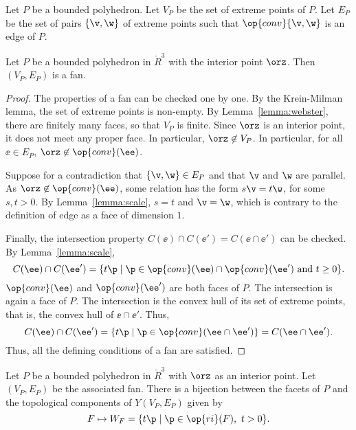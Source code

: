 \begin{definition}[$(V_P,E_P)$]
Let $P$ be a bounded polyhedron.  Let
$V_P$ be the set of extreme points of $P$.  Let $E_P$ be the set of pairs
$\{\v,\w\}$ of extreme points such that $\op{conv}\{\v,\w\}$ is an edge of
$P$.
\end{definition}
%
%

\begin{lemma}[]\label{lemma:polyhedron}%
Let $P$ be a bounded polyhedron in $\ring{R}^3$ with the interior
point $\orz$.  Then $(V_P,E_P)$ is a fan.
\end{lemma}
%

\begin{proof} The properties of a fan can be checked one by one.  By
the Krein-Milman lemma, the set of extreme points is non-empty.  By
Lemma~\ref{lemma:webster}, there are finitely many faces, so that
$V_P$ is finite.  Since $\orz$ is an interior point, it does not
meet any proper face.  In particular, $\orz\not\in V_P$.  In particular,
for all $\ee\in E_P$, $\orz\not\in \op{conv}(\ee)$.

Suppose for a contradiction that $\{\v,\w\}\in E_P$ and that $\v$
and $\w$ are parallel.  As $\orz\not\in \op{conv}(\ee)$, some
relation has the form $s \v = t \w$, for some $s, t>0$.  By
Lemma~\ref{lemma:scale}, $s=t$ and $\v=\w$, which is contrary to the
definition of edge as a face of dimension $1$.

Finally, the intersection property $C(\ee)\cap C(\ee') = C(\ee \cap
\ee')$ can be checked.  By Lemma~\ref{lemma:scale},
\begin{displaymath}
C(\ee) \cap C(\ee') = \{t \p \mid \p\in \op{conv}(\ee) \cap \op{conv}(\ee') \text{ and } t \ge 0\}.
\end{displaymath}
$\op{conv}(\ee)$ and $\op{conv}(\ee')$ are both faces of $P$.  The
intersection is again a face of $P$.  The intersection is the convex
hull of its set of extreme points, that is, the convex hull of $\ee \cap \ee'$.
Thus,
\begin{displaymath}
C(\ee)\cap C(\ee') = \{t \p \mid \p\in \op{conv}(\ee\cap \ee')\} = C(\ee \cap \ee').
\end{displaymath}
Thus, all the defining conditions of a fan are satisfied.
\end{proof}


\begin{lemma}[]\label{lemma:WF} 
Let $P$ be a bounded polyhedron in $\ring{R}^3$ with $\orz$ as an
interior point.  Let $(V_P,E_P)$ be the associated fan.  There is a
bijection between the facets of $P$ and the topological components
of $Y(V_P,E_P)$ given by
\begin{displaymath}
F \mapsto W_F = \{t \p \mid \p\in \op{ri}(F),~t >0\}.
\end{displaymath}
\end{lemma}
%


